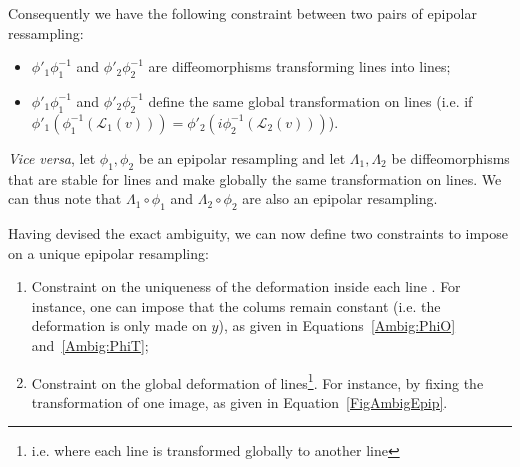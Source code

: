 \documentclass{ipol}
\newcommand{\LineE}[1]{\ensuremath{\mathcal{L}_{#1}}}
\newcommand{\LineO}{\LineE{1}}
\newcommand{\LineT}{\LineE{2}}
\newcommand{\LineK}{\LineE{k}}
\newcommand{\CurveE}[1]{\ensuremath{\mathcal{C}_{#1}}}
\newcommand{\CurveO}{\CurveE{1}}
\newcommand{\CurveT}{\CurveE{2}}
\newcommand{\CurveK}{\CurveE{k}}
\begin{document}
Consequently we have the following constraint between two pairs of epipolar ressampling:

\begin{itemize}
   \item  $\phi'_1 \phi_1^{-1}$  and $\phi'_2 \phi_2^{-1}$ are diffeomorphisms transforming lines into lines;
   \item $\phi'_1 \phi_1^{-1}$  and $\phi'_2 \phi_2^{-1}$ define the same global transformation on lines
        (i.e. if $\phi'_1 (\phi_1^{-1} (\LineO(v))) = \phi'_2 (i\phi_2^{-1}(\LineT(v)))$).
\end{itemize}



\emph{Vice versa}, let  $\phi_1,\phi_2$ be an epipolar resampling and let $\Lambda_1,\Lambda_2$ 
be diffeomorphisms  that are stable for lines and make globally the same transformation on lines. We can thus note that $\Lambda_1 \circ \phi_1$ and  $\Lambda_2 \circ \phi_2$ are also an epipolar resampling.


Having devised the exact ambiguity, we can now define two constraints to impose on a unique epipolar resampling: 
\begin{enumerate}
\item Constraint on the uniqueness of the deformation
inside each line . For instance, one can impose that the colums remain constant (i.e.
the deformation is only made  on  $y$), as given in Equations~\eqref{Ambig:PhiO}
and~\eqref{Ambig:PhiT};
\item Constraint on the global deformation of lines\footnote{i.e. where each line
is transformed globally to another line}. For instance, by fixing the transformation of one image, as given in Equation~\eqref{FigAmbigEpip}.
\end{enumerate}
 
\end{document}
